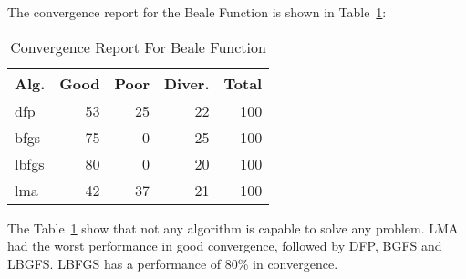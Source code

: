 
The convergence report for the Beale Function is shown in Table~\ref{convergence:beale}:

\begin{table}[H]
\centering
\caption{Convergence Report For Beale Function}
\label{convergence:beale}
\begin{tabular}{lrrrr}
\toprule
 Alg. &  Good &  Poor &  Diver. &  Total \\
\midrule
  dfp &    53 &    25 &      22 &    100 \\
 bfgs &    75 &     0 &      25 &    100 \\
lbfgs &    80 &     0 &      20 &    100 \\
  lma &    42 &    37 &      21 &    100 \\
\bottomrule
\end{tabular}
\end{table}

The Table~\ref{convergence:beale} show that not any algorithm
is capable to solve any problem. LMA had the worst performance
in good convergence, followed by DFP, BGFS and LBGFS. LBFGS has
a performance of 80\% in convergence.

